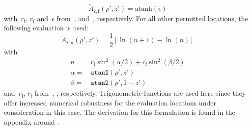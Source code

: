 \begin{equation}
  \tilde{A}_\mathrm{z,f}(\rho', z') = \textrm{atanh} (\epsilon)
\end{equation}
with~$r_\mathrm{i}$, $r_\mathrm{f}$ and~$\epsilon$ from~,  and~, respectively.
For all other permitted locations, the following evaluation is used:
\begin{equation}
  \tilde{A}_\mathrm{z,n} (\rho', z') = \frac{1}{2} \left[ \ln\left(n + 1 \right) - \ln \left( n \right)  \right] \label{eqn:sws_A_z_n}
\end{equation}
with
\begin{align}
  n                       =&\, r_\mathrm{i} \sin^2(\alpha/2) + r_\mathrm{f} \sin^2(\beta/2) \\
  \alpha =&\, \texttt{atan2}(\rho', z')   \label{eqn:sws_alpha} \\
  \beta  =&\, \texttt{atan2}(\rho', 1-z') \label{eqn:sws_beta}
\end{align}
and~$r_\mathrm{i}$, $r_\mathrm{f}$ from~, , respectively.
Trigonometric functions are used here since they offer increased numerical robustness
for the evaluation locations under consideration in this case.
The derivation for this formulation is found in the appendix around .

